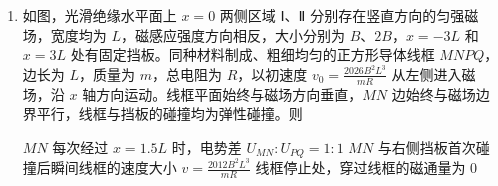 \documentclass[\gkver]{gaokaozhenti}
\begin{document}
\begin{enumerate}
{B．根据 $v=\omega r$ 结合 A 选项分析可知卫星线速度大于地球的线速度，故 B 错误；

C．根据题意可知太阳和地球对卫星引力的合力提供卫星做圆周运动的向心力，向心力一定指向圆心，即向心力一定指向 $P$ 点，故 C 错误；

D．根据题意可知太阳和卫星的距离等于地球和卫星的距离，根据万有引力的表达式 $F=G\frac{Mm}{r^{2}}$ 可知太阳和地球对卫星的引力大小之比等于太阳和地球的质量之比，故 D 正确。

故选 AD。
}
\item
如图，光滑绝缘水平面上 $x=0$ 两侧区域 Ⅰ、Ⅱ 分别存在竖直方向的匀强磁场，宽度均为 $L$，磁感应强度方向相反，大小分别为 $B$、$2B$，$x=-3L$ 和 $x=3L$ 处有固定挡板。同种材料制成、粗细均匀的正方形导体线框 $MNPQ$，边长为 $L$，质量为 $m$，总电阻为 $R$，以初速度 $v_{0}=\frac{2026B^{2}L^{3}}{mR}$ 从左侧进入磁场，沿 $x$ 轴方向运动。线框平面始终与磁场方向垂直，$MN$ 边始终与磁场边界平行，线框与挡板的碰撞均为弹性碰撞。则 
\onepicture[w=11.46cm]{}

{$MN$ 每次经过 $x=1.5L$ 时，电势差 $U_{MN}:U_{PQ}=1:1$}
{$MN$ 与右侧挡板首次碰撞后瞬间线框的速度大小 $v=\frac{2012B^{2}L^{3}}{mR}$}
{线框停止处，穿过线框的磁通量为 0}

\end{enumerate}
\end{document}
